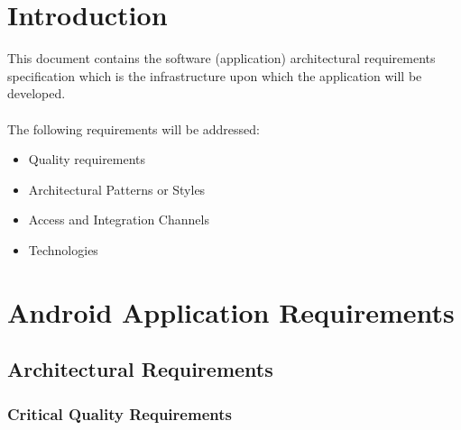 \documentclass[hidelinks, 12pt, oneside]{article}
\begin{document}
	
	\tableofcontents
	\newpage
	
	\section{Introduction}
	
	This document contains the software (application) architectural requirements specification which is the infrastructure upon which the application will be developed.\\\\
	The following requirements will be addressed:
	\begin{itemize}
		\item Quality requirements
		\item Architectural Patterns or Styles
		\item Access and Integration Channels
		\item Technologies
	\end{itemize}	 
	\newpage
	\section{Android Application Requirements}
	\subsection{Architectural Requirements}
		\subsubsection{Critical Quality Requirements} 
\end{document}
